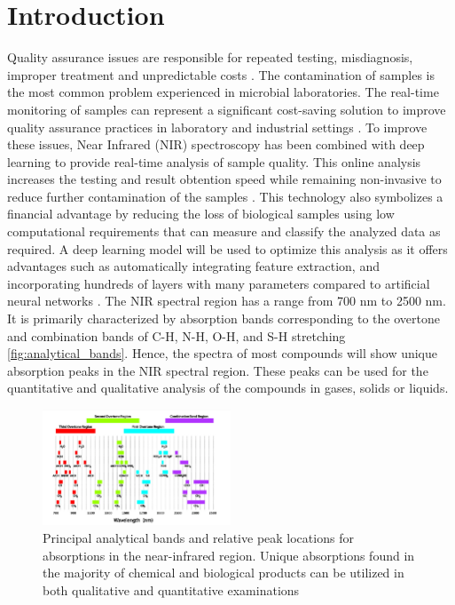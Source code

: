 \documentclass[final, 3p, 11pt]{elsarticle}
\begin{document}
\section{Introduction}
Quality assurance issues are responsible for repeated testing, misdiagnosis, improper treatment and unpredictable costs \citep{randox_quality}. The contamination of samples is the most common problem experienced in microbial laboratories. The real-time monitoring of samples can represent a significant cost-saving solution to improve quality assurance practices in laboratory and industrial settings \citep{abatenh2018contamination}. To improve these issues, Near Infrared (NIR) spectroscopy has been combined with deep learning to provide real-time analysis of sample quality. This online analysis increases the testing and result obtention speed while remaining non-invasive to reduce further contamination of the samples \citep{sohn2021gmo}. This technology also symbolizes a financial advantage by reducing the loss of biological samples using low computational requirements that can measure and classify the analyzed data as required. A deep learning model will be used to optimize this analysis as it offers advantages such as automatically integrating feature extraction, and incorporating hundreds of layers with many parameters compared to artificial neural networks \citep{mishra2022hypes}.
The NIR spectral region has a range from 700 nm to 2500 nm. It is primarily characterized by absorption bands corresponding to the overtone and combination bands of C-H, N-H, O-H, and S-H stretching \autoref{fig:analytical_bands}. Hence, the spectra of most compounds will show unique absorption peaks in the NIR spectral region. These peaks can be used for the quantitative and qualitative analysis of the compounds in gases, solids or liquids.
\begin{figure}[h]
        \centering
        \includegraphics[width=0.5\textwidth]{Images/principle_analytical_bands.png}
        \caption{Principal analytical bands and relative peak locations for absorptions in the near-infrared region. Unique absorptions found in the majority of chemical and biological products can be utilized in both qualitative and quantitative examinations}
        \label{fig:analytical_bands}
        \end{figure}
\end{document}
